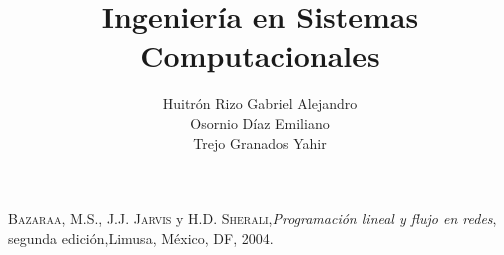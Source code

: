 \documentclass[letterpaper,12pt,oneside]{book}
\author{Huitr\'on Rizo Gabriel Alejandro\\Osornio D\'iaz Emiliano\\Trejo Granados Yahir}
\title{Ingenier\'ia en Sistemas Computacionales}
\begin{document}
\frontmatter
\maketitle

\tableofcontents
\listoffigures
\listoftables
    
\mainmatter










\cleardoublepage
\providecommand\phantomsection{}

\begin{thebibliography}{10} %
     \textsc{Bazaraa, M.S., J.J. Jarvis} y \textsc{H.D. Sherali},\textit{Programaci\'on lineal y flujo en redes}, segunda edici\'on,Limusa, M\'exico, DF, 2004. %
\end{thebibliography}


%
%

\backmatter%
\end{document}
